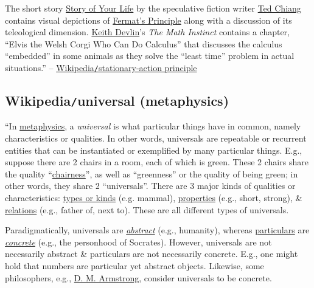 \documentclass{article}
\begin{document}
The short story \href{https://en.wikipedia.org/wiki/Story_of_Your_Life}{Story of Your Life} by the speculative fiction writer \href{https://en.wikipedia.org/wiki/Ted_Chiang}{Ted Chiang} contains visual depictions of \href{https://en.wikipedia.org/wiki/Fermat%27s_Principle}{Fermat's Principle} along with a discussion of its teleological dimension. \href{https://en.wikipedia.org/wiki/Keith_Devlin}{Keith Devlin}'s \textit{The Math Instinct} contains a chapter, ``Elvis the Welsh Corgi Who Can Do Calculus'' that discusses the calculus ``embedded'' in some animals as they solve the ``least time'' problem in actual situations.'' -- \href{https://en.wikipedia.org/wiki/Stationary-action_principle}{Wikipedia{\tt/}stationary-action principle}


\subsection{Wikipedia{\tt/}universal (metaphysics)}
``In \href{https://en.wikipedia.org/wiki/Metaphysics}{metaphysics}, a {\it universal} is what particular things have in common, namely characteristics or qualities. In other words, universals are repeatable or recurrent entities that can be instantiated or exemplified by many particular things. E.g., suppose there are 2 chairs in a room, each of which is green. These 2 chairs share the quality ``\href{https://en.wiktionary.org/wiki/chairness}{chairness}'', as well as ``greenness'' or the quality of being green; in other words, they share 2 ``universals''. There are 3 major kinds of qualities or characteristics: \href{https://en.wikipedia.org/wiki/Type_(metaphysics)}{types or kinds} (e.g. mammal), \href{https://en.wikipedia.org/wiki/Property_(metaphysics)}{properties} (e.g., short, strong), \& \href{https://en.wikipedia.org/wiki/Relation_(metaphysics)}{relations} (e.g., father of, next to). These are all different types of universals.

Paradigmatically, universals are \href{https://en.wikipedia.org/wiki/Abstract_(philosophy)}{\it abstract} (e.g., humanity), whereas \href{https://en.wikipedia.org/wiki/Particular}{particulars} are \href{https://en.wikipedia.org/wiki/Concrete_(philosophy)}{\it concrete} (e.g., the personhood of Socrates). However, universals are not necessarily abstract \& particulars are not necessarily concrete. E.g., one might hold that numbers are particular yet abstract objects. Likewise, some philosophers, e.g., \href{https://en.wikipedia.org/wiki/David_Malet_Armstrong}{\sc D. M. Armstrong}, consider universals to be concrete.
\end{document}
